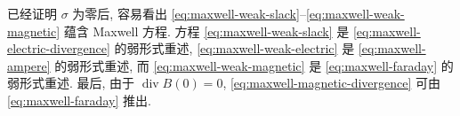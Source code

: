 {已经证明 $\sigma$ 为零后, 容易看出 \eqref{eq:maxwell-weak-slack}--\eqref{eq:maxwell-weak-magnetic} 蕴含 Maxwell 方程. 方程 \eqref{eq:maxwell-weak-slack} 是 \eqref{eq:maxwell-electric-divergence} 的弱形式重述, \eqref{eq:maxwell-weak-electric} 是 \eqref{eq:maxwell-ampere} 的弱形式重述, 而 \eqref{eq:maxwell-weak-magnetic} 是 \eqref{eq:maxwell-faraday} 的弱形式重述. 最后, 由于 $\operatorname{div}B(0)=0$, \eqref{eq:maxwell-magnetic-divergence} 可由 \eqref{eq:maxwell-faraday} 推出.}
